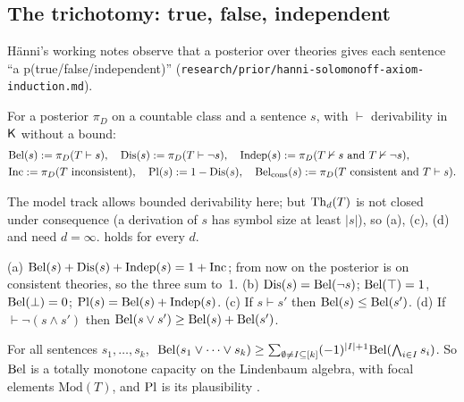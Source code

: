 \subsection{The trichotomy: true, false, independent}\label{sec:sound:tri}

H\"anni's working notes \citep{hanni2026notes} observe that a posterior over theories gives each sentence ``a p(true/\allowbreak false/\allowbreak independent)'' (\nolinkurl{research/prior/hanni-solomonoff-axiom-induction.md}).

\begin{definition}\label{def:sound:tri}
For a posterior $\pi_D$ on a countable class and a sentence $s$, with $\vdash$ derivability in $\mathsf{K}$ without a bound:
\[
\begin{aligned}
&\mathrm{Bel}(s):=\pi_D(T\vdash s),\quad \mathrm{Dis}(s):=\pi_D(T\vdash\neg s),\quad \mathrm{Indep}(s):=\pi_D(T\nvdash s\text{ and }T\nvdash\neg s),\\
&\mathrm{Inc}:=\pi_D(T\text{ inconsistent}),\quad \mathrm{Pl}(s):=1-\mathrm{Dis}(s),\quad \mathrm{Bel}_{\mathrm{cons}}(s):=\pi_D(T\text{ consistent and }T\vdash s).
\end{aligned}
\]
\end{definition}

The model track allows bounded derivability here; but $\mathrm{Th}_d(T)$ is not closed under consequence (a derivation of $s$ has symbol size at least $|s|$), so (a), (c), (d) and  need $d=\infty$.  holds for every $d$.

\begin{proposition}\label{prop:sound:laws}
(a) $\mathrm{Bel}(s)+\mathrm{Dis}(s)+\mathrm{Indep}(s)=1+\mathrm{Inc}$; from now on the posterior is on consistent theories, so the three sum to~1. (b) $\mathrm{Dis}(s)=\mathrm{Bel}(\neg s)$; $\mathrm{Bel}(\top)=1$, $\mathrm{Bel}(\bot)=0$; $\mathrm{Pl}(s)=\mathrm{Bel}(s)+\mathrm{Indep}(s)$. (c) If $s\vdash s'$ then $\mathrm{Bel}(s)\le\mathrm{Bel}(s')$. (d) If $\vdash\neg(s\wedge s')$ then $\mathrm{Bel}(s\vee s')\ge\mathrm{Bel}(s)+\mathrm{Bel}(s')$.
\end{proposition}

\begin{proposition}\label{prop:sound:belief}
For all sentences $s_1,\dots,s_k$, $\ \mathrm{Bel}(s_1\vee\dots\vee s_k)\ge\sum_{\emptyset\ne I\subseteq[k]}(-1)^{|I|+1}\mathrm{Bel}(\bigwedge_{i\in I}s_i)$. So $\mathrm{Bel}$ is a totally monotone capacity on the Lindenbaum algebra, with focal elements $\mathrm{Mod}(T)$, and $\mathrm{Pl}$ is its plausibility \citep{shafer1976mathematical}.
\end{proposition}

